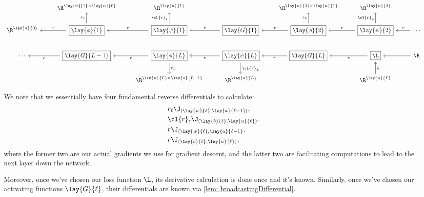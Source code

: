 {\tiny
\begin{equation*}
	\begin{tikzcd}
		{}
		&\R^{\lay{n}{1}\times\lay{n}{0}}
		&\R^{\lay{n}{1}}
		&{}
		&\R^{\lay{n}{2}\times\lay{n}{1}}
		&\R^{\lay{n}{2}}
		\\
		\R^{\lay{n}{0}}
		&\boxed{\lay{\phi}{1}}
		\arrow[u, "r_1"]
		\arrow[l, swap, "r"]
		&\boxed{\lay{\psi}{1}}
		\arrow[u, "\cl{r}_1"]
		\arrow[l, swap, "r"]
		&\boxed{\lay{G}{1}}
		\arrow[l, swap, "r"]
		&\boxed{\lay{\phi}{2}}
		\arrow[u,  "r_2"]
		\arrow[l, swap, "r"]
		&\boxed{\lay{\psi}{2}}
		\arrow[u, "\cl{r}_2"]
		\arrow[l, swap, "r"]
		&\cdots
		\arrow[l, swap, "r"]\\
		\cdots
		&\boxed{\lay{G}{L-1}}
		\arrow[l, "r"]
		&\boxed{\lay{\phi}{L}}
		\arrow[d, "r_L"]
		\arrow[l, "r"]
		&\boxed{\lay{\psi}{L}}
		\arrow[d, "\cl{r}_L"]
		\arrow[l, "r"]
		&\boxed{\lay{G}{L}}
		\arrow[l, "r"]
		&\boxed{\L}
		\arrow[l, "r"]
		&\R
		\arrow[l]
		\\
		{}
		&{}
		&\R^{\lay{n}{L}\times\lay{n}{L-1}}
		&\R^{\lay{n}{L}}
		&{}
		&\R^{\lay{n}{L}}
		\arrow[u, swap, "y"]
		&{}
	\end{tikzcd}
\end{equation*}
}

We note that we essentially have four fundamental reverse differentials to calculate:
\begin{align*}
	&r_\ell\J_{(\lay{w}{\ell},\lay{a}{\ell-1})},\\
	&\cl{r}_\ell\J_{(\lay{b}{\ell},\lay{u}{\ell})}.\\
	&r\J_{(\lay{w}{\ell},\lay{a}{\ell-1}},\\
	&r\J_{(\lay{b}{\ell},\lay{u}{\ell})},
\end{align*}
where the former two are our actual gradients we use for gradient descent, and the latter two are facilitating computations to lead to the next layer down the network.

Moreover, once we've chosen our loss function $\L$, its derivative calculation is done once and it's known.  Similarly, once we've chosen our activating functions $\lay{G}{\ell}$, their differentials are known via \cref{lem: broadcastingDifferential}.




